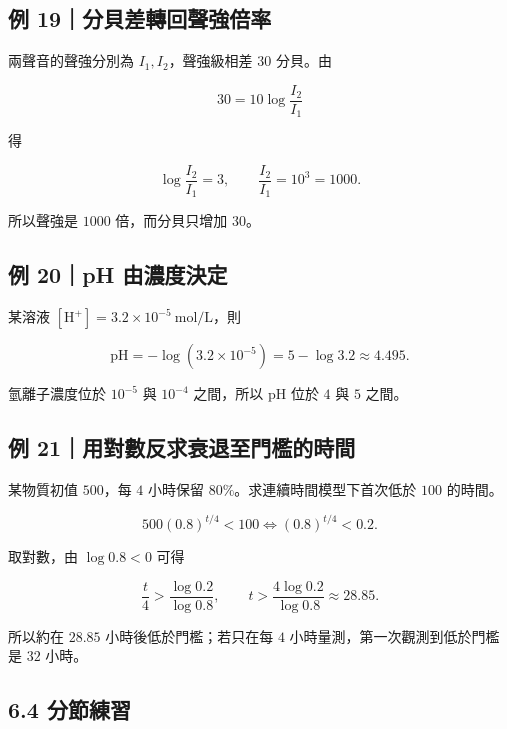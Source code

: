 \documentclass[11pt,a4paper]{article}
\begin{document}
\subsection{例 19｜分貝差轉回聲強倍率}\label{ux4f8b-19ux5206ux8c9dux5deeux8f49ux56deux8072ux5f37ux500dux7387}

兩聲音的聲強分別為 \(I_1,I_2\)，聲強級相差 \(30\) 分貝。由

\[
30=10\log\frac{I_2}{I_1}
\]

得

\[
\log\frac{I_2}{I_1}=3,\qquad
\frac{I_2}{I_1}=10^3=1000.
\]

所以聲強是 \(1000\) 倍，而分貝只增加 \(30\)。

\subsection{例 20｜pH 由濃度決定}\label{ux4f8b-20ph-ux7531ux6fc3ux5ea6ux6c7aux5b9a}

某溶液 \([\mathrm H^+]=3.2\times10^{-5}\mathrm{\ mol/L}\)，則

\[
\mathrm{pH}=-\log(3.2\times10^{-5})
=5-\log3.2\approx4.495.
\]

氫離子濃度位於 \(10^{-5}\) 與 \(10^{-4}\) 之間，所以 pH 位於 \(4\) 與 \(5\) 之間。

\subsection{例 21｜用對數反求衰退至門檻的時間}\label{ux4f8b-21ux7528ux5c0dux6578ux53cdux6c42ux8870ux9000ux81f3ux9580ux6abbux7684ux6642ux9593}

某物質初值 \(500\)，每 \(4\) 小時保留 \(80\%\)。求連續時間模型下首次低於 \(100\) 的時間。

\[
500(0.8)^{t/4}<100
\Longleftrightarrow (0.8)^{t/4}<0.2.
\]

取對數，由 \(\log0.8<0\) 可得

\[
\frac t4>\frac{\log0.2}{\log0.8},\qquad
t>\frac{4\log0.2}{\log0.8}\approx28.85.
\]

所以約在 \(28.85\) 小時後低於門檻；若只在每 \(4\) 小時量測，第一次觀測到低於門檻是 \(32\) 小時。

\subsection{6.4 分節練習}\label{ux5206ux7bc0ux7df4ux7fd2-5}
\end{document}
